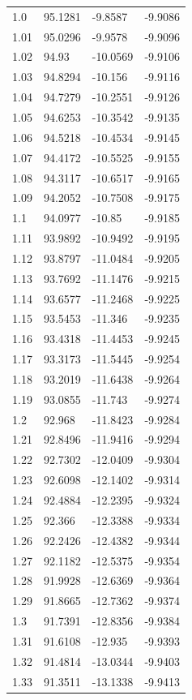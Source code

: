 \begin{tabular}{llll}
1.0 & 95.1281 & -9.8587 & -9.9086 \\
1.01 & 95.0296 & -9.9578 & -9.9096 \\
1.02 & 94.93 & -10.0569 & -9.9106 \\
1.03 & 94.8294 & -10.156 & -9.9116 \\
1.04 & 94.7279 & -10.2551 & -9.9126 \\
1.05 & 94.6253 & -10.3542 & -9.9135 \\
1.06 & 94.5218 & -10.4534 & -9.9145 \\
1.07 & 94.4172 & -10.5525 & -9.9155 \\
1.08 & 94.3117 & -10.6517 & -9.9165 \\
1.09 & 94.2052 & -10.7508 & -9.9175 \\
1.1 & 94.0977 & -10.85 & -9.9185 \\
1.11 & 93.9892 & -10.9492 & -9.9195 \\
1.12 & 93.8797 & -11.0484 & -9.9205 \\
1.13 & 93.7692 & -11.1476 & -9.9215 \\
1.14 & 93.6577 & -11.2468 & -9.9225 \\
1.15 & 93.5453 & -11.346 & -9.9235 \\
1.16 & 93.4318 & -11.4453 & -9.9245 \\
1.17 & 93.3173 & -11.5445 & -9.9254 \\
1.18 & 93.2019 & -11.6438 & -9.9264 \\
1.19 & 93.0855 & -11.743 & -9.9274 \\
1.2 & 92.968 & -11.8423 & -9.9284 \\
1.21 & 92.8496 & -11.9416 & -9.9294 \\
1.22 & 92.7302 & -12.0409 & -9.9304 \\
1.23 & 92.6098 & -12.1402 & -9.9314 \\
1.24 & 92.4884 & -12.2395 & -9.9324 \\
1.25 & 92.366 & -12.3388 & -9.9334 \\
1.26 & 92.2426 & -12.4382 & -9.9344 \\
1.27 & 92.1182 & -12.5375 & -9.9354 \\
1.28 & 91.9928 & -12.6369 & -9.9364 \\
1.29 & 91.8665 & -12.7362 & -9.9374 \\
1.3 & 91.7391 & -12.8356 & -9.9384 \\
1.31 & 91.6108 & -12.935 & -9.9393 \\
1.32 & 91.4814 & -13.0344 & -9.9403 \\
1.33 & 91.3511 & -13.1338 & -9.9413 \\

\end{tabular}
